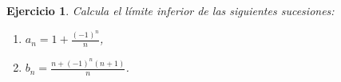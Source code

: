 \documentclass[11pt]{report}
\newtheorem{ex}{Ejercicio}
\begin{document}
\begin{ex}
  Calcula el límite inferior de las siguientes sucesiones:
  \begin{enumerate}
    \item \( a_n = 1 + \frac{(-1)^n}{n} \),
    \item \( b_n = \frac{n + (-1)^n (n+1)}{n} \).
  \end{enumerate}


\end{ex}
\end{document}
